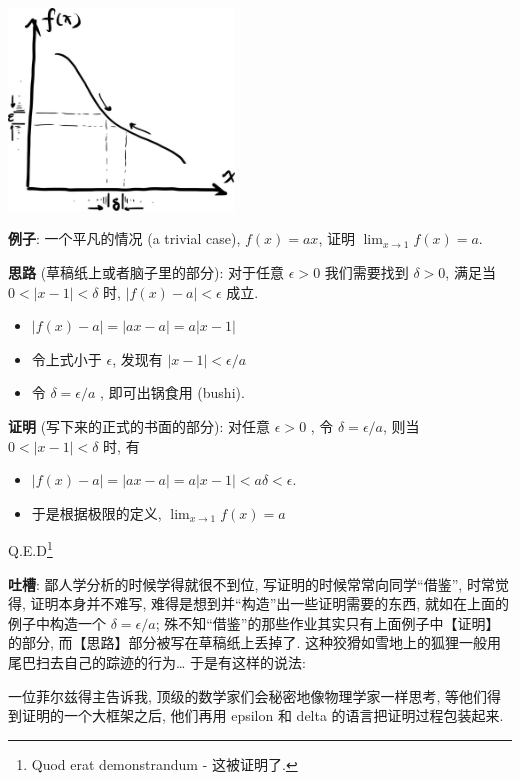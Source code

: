 \begin{tcolorbox}[size=fbox, breakable, enhanced jigsaw]
  \includegraphics[width=0.45\textwidth]{img/image-20230503152041842.png}
\end{tcolorbox}

\begin{newquote}
\textbf{例子}: 一个平凡的情况 (a trivial case), $f(x)=ax$, 证明
$\lim_{x\rightarrow 1}f(x)=a$.

\textbf{思路} (草稿纸上或者脑子里的部分): 对于任意 $\epsilon>0$
我们需要找到 $\delta>0$, 满足当 $0<|x-1|<\delta$ 时,
$|f(x)-a|<\epsilon$ 成立.

\begin{itemize}
\item
  $|f(x)-a|=|ax-a|=a|x-1|$
\item
  令上式小于 $\epsilon$, 发现有 $|x-1|<\epsilon/a$
\item
  令 $\delta=\epsilon/a$ , 即可出锅食用 (bushi).
\end{itemize}

\textbf{证明} (写下来的正式的书面的部分): 对任意 $\epsilon>0$ , 令
$\delta=\epsilon/a$, 则当 $0<|x-1|<\delta$ 时, 有

\begin{itemize}

\item
  $|f(x)-a|=|ax-a|=a|x-1|<a\delta<\epsilon$.
\item
  于是根据极限的定义, $\lim_{x\rightarrow 1}f(x)=a$
\end{itemize}

Q.E.D\footnote{Quod erat demonstrandum - 这被证明了.}

\textbf{吐槽}: 鄙人学分析的时候学得就很不到位,
写证明的时候常常向同学``借鉴'', 时常觉得, 证明本身并不难写,
难得是想到并``构造''出一些证明需要的东西, 就如在上面的例子中构造一个
$\delta=\epsilon/a$;
殊不知``借鉴''的那些作业其实只有上面例子中【证明】的部分,
而【思路】部分被写在草稿纸上丢掉了.
这种狡猾如雪地上的狐狸一般用尾巴扫去自己的踪迹的行为\ldots{}
于是有这样的说法:

一位菲尔兹得主告诉我, 顶级的数学家们会秘密地像物理学家一样思考,
等他们得到证明的一个大框架之后, 他们再用 epsilon 和 delta
的语言把证明过程包装起来.
\end{newquote}

